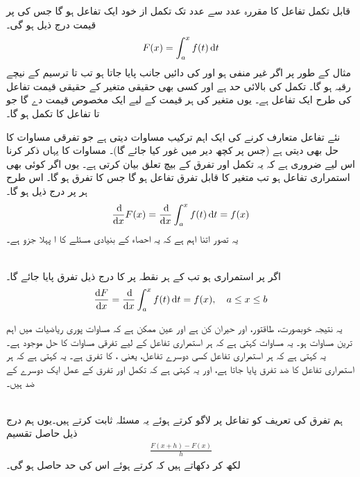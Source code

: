 قابل تکمل تفاعل  کا مقررہ عدد  سے  عدد  تک تکمل  از خود ایک تفاعل  ہو گا جس کی  پر قیمت درج ذیل ہو گی۔
\begin{align}\label{مساوات_تکمل_بنیادی_مسئلہ_الف}
F(x)=\int_a^xf(t)\dif t
\end{align} 
مثال کے طور پر اگر  غیر منفی ہو اور  کی  دائیں جانب  پایا جاتا ہو تب  تا  ترسیم کے نیچے رقبہ  ہو گا۔ تکمل کی  بالائی حد  ہے اور  کسی بھی حقیقی متغیر کے حقیقی قیمت تفاعل کی طرح ایک تفاعل ہے۔ یوں متغیر  کی ہر قیمت کے لیے  ایک مخصوص قیمت دے گا جو  تا  تفاعل  کا تکمل ہو گا۔  

نئے تفاعل متعارف کرنے کی ایک اہم ترکیب مساوات  دیتی ہے جو تفرقی مساوات کا حل بھی دیتی ہے (جس پر کچھ دیر میں غور کیا جائے گا)۔ مساوات  کا یہاں ذکر کرنا اس لیے ضروری ہے کہ یہ تکمل اور تفرق کے بیچ تعلق بیان کرتی ہے۔ یوں اگر  کوئی بھی استمراری تفاعل ہو تب  متغیر  کا قابل تفرق تفاعل ہو گا جس کا تفرق  ہو گا۔ اس طرح ہر  پر درج ذیل ہو گا۔
\begin{align*}
\frac{\dif}{\dif x}F(x)=\frac{\dif}{\dif x}\int_a^xf(t)\dif t=f(x)
\end{align*}
یہ تصور اتنا اہم ہے کہ یہ احصاء کے بنیادی مسئلے کا ا پہلا جزو   ہے۔

\\
اگر  پر  استمراری ہو تب  کے ہر نقطہ پر  کا درج ذیل تفرق پایا جائے گا۔
\begin{align}\label{مساوات_تکمل_بنیادی_مسئلہ_ب}
\frac{\dif F}{\dif x}=\frac{\dif}{\dif x}\int_a^xf(t)\dif t=f(x),\quad a\le x\le b
\end{align}

یہ نتیجہ خوبصورت، طاقتور، اور حیران کن ہے اور عین ممکن ہے کہ مساوات  پوری ریاضیات میں اہم ترین مساوات ہو۔ یہ مساوات  کہتی ہے کہ ہر استمراری تفاعل  کے لیے  تفرقی
 مساوات  کا حل موجود ہے۔ یہ کہتی ہے کہ ہر استمراری تفاعل  کسی دوسرے تفاعل، یعنی ، کا تفرق ہے۔ یہ کہتی ہے کہ ہر استمراری تفاعل کا ضد تفرق پایا جاتا ہے،  اور یہ کہتی ہے کہ تکمل اور تفرق کے عمل ایک دوسرے کے ضد ہیں۔ 

\\
ہم تفرق کی تعریف کو تفاعل  پر لاگو کرتے ہوئے یہ  مسئلہ  ثابت کرتے ہیں۔یوں  ہم درج ذیل حاصل تقسیم
\begin{align}\label{مساوات_تکمل_بنیادی_مسئلہ_پ}
\frac{F(x+h)-F(x)}{h}
\end{align}
لکھ کر دکھاتے ہیں کہ  کرتے ہوئے اس کی حد    حاصل ہو گی۔

